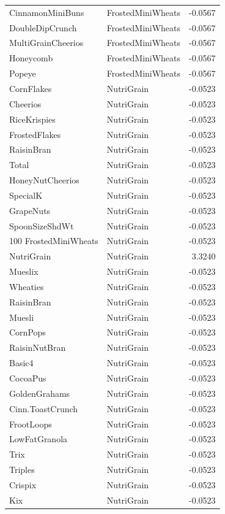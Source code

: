 \begin{longtable}{llr}
CinnamonMiniBuns & FrostedMiniWheats & -0.0567 \\
DoubleDipCrunch & FrostedMiniWheats & -0.0567 \\
MultiGrainCheerios & FrostedMiniWheats & -0.0567 \\
Honeycomb & FrostedMiniWheats & -0.0567 \\
Popeye & FrostedMiniWheats & -0.0567 \\
CornFlakes & NutriGrain & -0.0523 \\
Cheerios & NutriGrain & -0.0523 \\
RiceKrispies & NutriGrain & -0.0523 \\
FrostedFlakes & NutriGrain & -0.0523 \\
RaisinBran & NutriGrain & -0.0523 \\
Total & NutriGrain & -0.0523 \\
HoneyNutCheerios & NutriGrain & -0.0523 \\
SpecialK & NutriGrain & -0.0523 \\
GrapeNuts & NutriGrain & -0.0523 \\
SpoonSizeShdWt & NutriGrain & -0.0523 \\
100%
FrostedMiniWheats & NutriGrain & -0.0523 \\
NutriGrain & NutriGrain & 3.3240 \\
Mueslix & NutriGrain & -0.0523 \\
Wheaties & NutriGrain & -0.0523 \\
RaisinBran & NutriGrain & -0.0523 \\
Muesli & NutriGrain & -0.0523 \\
CornPops & NutriGrain & -0.0523 \\
RaisinNutBran & NutriGrain & -0.0523 \\
Basic4 & NutriGrain & -0.0523 \\
CocoaPus & NutriGrain & -0.0523 \\
GoldenGrahams & NutriGrain & -0.0523 \\
Cinn.ToastCrunch & NutriGrain & -0.0523 \\
FrootLoops & NutriGrain & -0.0523 \\
LowFatGranola & NutriGrain & -0.0523 \\
Trix & NutriGrain & -0.0523 \\
Triples & NutriGrain & -0.0523 \\
Crispix & NutriGrain & -0.0523 \\
Kix & NutriGrain & -0.0523 \\

\end{longtable}
